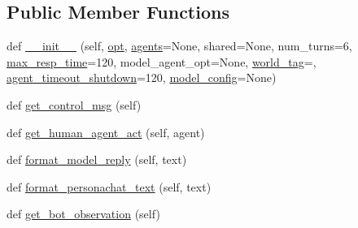 \subsection*{Public Member Functions}
\begin{DoxyCompactItemize}
\item 
def \hyperlink{classprojects_1_1controllable__dialogue_1_1mturk_1_1worlds_1_1ControllableDialogEval_af8577bcfacb6749666bb1f86a37add05}{\+\_\+\+\_\+init\+\_\+\+\_\+} (self, \hyperlink{classprojects_1_1controllable__dialogue_1_1mturk_1_1worlds_1_1ControllableDialogEval_a54356b3342ada9f2aab04c87542cec4c}{opt}, \hyperlink{classparlai_1_1core_1_1worlds_1_1MultiAgentDialogWorld_a05fc93525cb86edef121980fc55f9926}{agents}=None, shared=None, num\+\_\+turns=6, \hyperlink{classprojects_1_1controllable__dialogue_1_1mturk_1_1worlds_1_1ControllableDialogEval_a3e40b9dc7484a38962b26f7d7881093c}{max\+\_\+resp\+\_\+time}=120, model\+\_\+agent\+\_\+opt=None, \hyperlink{classprojects_1_1controllable__dialogue_1_1mturk_1_1worlds_1_1ControllableDialogEval_a4fc8915e675f771861a93706f8b95ae3}{world\+\_\+tag}=\textquotesingle{}\textquotesingle{}, \hyperlink{classprojects_1_1controllable__dialogue_1_1mturk_1_1worlds_1_1ControllableDialogEval_a048080829c6345f85160e507a54eecf9}{agent\+\_\+timeout\+\_\+shutdown}=120, \hyperlink{classprojects_1_1controllable__dialogue_1_1mturk_1_1worlds_1_1ControllableDialogEval_ac5af40ec5149ca38b017b01e32cf07fd}{model\+\_\+config}=None)
\item 
def \hyperlink{classprojects_1_1controllable__dialogue_1_1mturk_1_1worlds_1_1ControllableDialogEval_a34462b54084fbcc9e7070d283e92266e}{get\+\_\+control\+\_\+msg} (self)
\item 
def \hyperlink{classprojects_1_1controllable__dialogue_1_1mturk_1_1worlds_1_1ControllableDialogEval_a327399861bbce821450a682bc9859f42}{get\+\_\+human\+\_\+agent\+\_\+act} (self, agent)
\item 
def \hyperlink{classprojects_1_1controllable__dialogue_1_1mturk_1_1worlds_1_1ControllableDialogEval_a93ab1ba4b0c7061ee7e566377be5c778}{format\+\_\+model\+\_\+reply} (self, text)
\item 
def \hyperlink{classprojects_1_1controllable__dialogue_1_1mturk_1_1worlds_1_1ControllableDialogEval_aa4b3c9e4169f5488bfc58e2a0ad26423}{format\+\_\+personachat\+\_\+text} (self, text)
\item 
def \hyperlink{classprojects_1_1controllable__dialogue_1_1mturk_1_1worlds_1_1ControllableDialogEval_aa5b2e18bf75fe4ae814672951ecc6e1d}{get\+\_\+bot\+\_\+observation} (self)
\item 

\end{DoxyCompactItemize}
